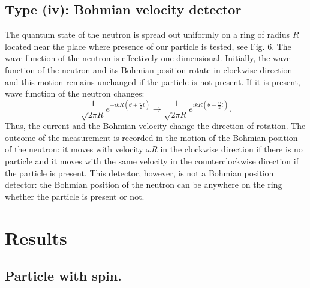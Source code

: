 \documentclass[preprint,tightenlines]{elsarticle}
\begin{document}
\subsection{  Type {\rm (iv)}: Bohmian velocity detector}

 The quantum state of the neutron
is spread out uniformly on a ring of radius $R$ located near the
place where presence of our particle is tested, see Fig. 6. The  wave
function of the neutron is effectively one-dimensional. Initially, the wave function of the neutron and its Bohmian position rotate
in clockwise direction and this motion remains unchanged if the particle
is not present. If it is present, wave function  of the neutron changes:
\begin{equation}
\frac{1}{\sqrt{2\pi R}}e^{-i\tilde{k}R(\tilde{\theta}+\frac{\omega}{2}t)}\rightarrow\frac{1}{\sqrt{2\pi R}}e^{i\tilde{k}R(\tilde{\theta}-\frac{\omega}{2}t)}.\label{BohmVdet}
\end{equation}
 Thus, the current and the Bohmian velocity change the direction of rotation. The outcome of the measurement is recorded in the motion of
the Bohmian position of the neutron: it moves with velocity $\omega R$
in the clockwise direction if there is no particle and it moves with
the same velocity in the counterclockwise direction if the particle is present.
This detector, however, is not a Bohmian position detector: the Bohmian position of the neutron
 can be anywhere on the ring whether the particle is present or not.



\section{ Results}

\subsection{ Particle with spin.}
\end{document}
